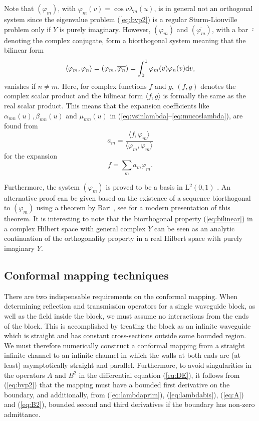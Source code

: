 \documentclass[numreferences]{kluwer}
\begin{document}
Note that $(\varphi_m)$, with $\varphi_m(v)=\cos v\lambda_m(u)$, is in
general not an orthogonal system since the eigenvalue problem
(\ref{eq:bvp2}) is a regular Sturm-Liouville problem only if $Y$ is
purely imaginary. However, $(\varphi_m)$ and $(\overline{\varphi_m})$,
with a bar $\overline{\cdot}$ denoting the complex conjugate, form a
biorthogonal system meaning that the bilinear form
\begin{equation}\label{eq:bilinear}
  \langle \varphi_m,\varphi_n\rangle 
  =(\varphi_m,\overline{\varphi_n})
  =\int_0^1\varphi_m(v)\varphi_n(v){\rm d}v,
\end{equation}
vanishes if $n\neq m$. Here, for complex functions $f$ and $g$,
$(f,g)$ denotes the complex scalar product and the bilinear form
$\langle f,g \rangle$ is formally the same as the real scalar
product. This means that the expansion coefficients like
$\alpha_{mn}(u),\beta_{mn}(u)$ and $\mu_{mn}(u)$ in
(\ref{eq:vsinlambda}--\ref{eq:mucoslambda}), are found from
\begin{equation}\label{eq:am}
 a_m=\frac{\langle f,\varphi_m \rangle}{\langle \varphi_m,\varphi_m \rangle}
\end{equation}
for the expansion
\begin{equation}\label{eq:expansion}
  f=\sum_m a_m \varphi_m.
\end{equation}

Furthermore, the system $(\varphi_m)$ is proved to be a basis in
L$^2(0,1)$ \cite{Schwartz:1954}. An alternative proof can be given
based on the existence of a sequence biorthogonal to $(\varphi_m)$
using a theorem by Bari \cite{Bari:1944}, see \cite{Christensson:2003}
for a modern presentation of this theorem. It is interesting to note
that the biorthogonal property (\ref{eq:bilinear}) in a complex
Hilbert space with general complex $Y$ can be seen as an analytic
continuation of the orthogonality property in a real Hilbert space
with purely imaginary $Y$.

\subsection{Conformal mapping techniques}
\label{sec:confmap}

There are two indispensable requirements on the conformal
mapping. When determining reflection and transmission operators for a
single waveguide block, as well as the field inside the block, we must
assume no interactions from the ends of the block. This is
accomplished by treating the block as an infinite waveguide which is
straight and has constant cross-sections outside some bounded
region. We must therefore numerically construct a conformal mapping
from a straight infinite channel to an infinite channel in which the
walls at both ends are (at least) asymptotically straight and
parallel. Furthermore, to avoid singularities in the operators $A$ and
$B^2$ in the differential equation (\ref{eq:DE}), it follows from
(\ref{eq:bvp2}) that the mapping must have a bounded first derivative
on the boundary, and additionally, from (\ref{eq:lambdaprim}),
(\ref{eq:lambdabis}), (\ref{eq:A}) and (\ref{eq:B2}), bounded second
and third derivatives if the boundary has non-zero admittance.
\end{document}
